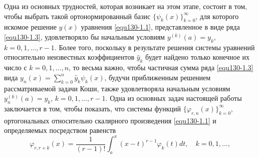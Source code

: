 Одна из основных трудностей, которая возникает на этом этапе, состоит в том, чтобы
выбрать такой ортонормированный базис $\{\psi_k(x)\}_{k=0}^\infty$, для которого искомое решение $y(x)$ уравнения \eqref{equ130-1.1}, представленное в виде ряда  \eqref{equ130-1.3}, удовлетворяло бы начальным условиям $y^{(k)}(a)=y_k$, $k=0,1,\ldots,r-1$. Более того, поскольку в результате решения системы уравнений относительно неизвестных коэффициентов $\hat y_k$  будет найдено только конечное их число с $k=0,1,\ldots, n$, то весьма важно, чтобы частичная сумма ряда \eqref{equ130-1.3} вида $ y_n(x)=\sum_{k=0}^n\hat y_k\psi_k(x)$,
 будучи приближенным решением рассматриваемой задачи Коши, также удовлетворяла начальным условиям $y_n^{(k)}(a)=y_k$, $k=0,1,\ldots,r-1$. Одна из основных задач настоящей работы заключается в том, чтобы показать, что системы функций
 $ \{\varphi_{r,n}(x)\}_{k=0}^\infty$, ортогональных относительно скалярного произведения \eqref{equ130-1.1} и определяемых посредством равенств
  \begin{equation}\label{equ130-1.4}
\varphi_{r,r+k}(x) =\frac{1}{(r-1)!}\int_a^x(x-t)^{r-1}\varphi_{k}(t)dt, \quad k=0,1,\ldots,
\end{equation}

